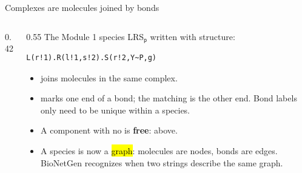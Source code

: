 \documentclass[aspectratio=169,10pt,t]{beamer}
\begin{document}
\begin{frame}[fragile]{Complexes are molecules joined by bonds}
  \begin{columns}[c]
    \begin{column}{0.42\textwidth}
      \centering
    \end{column}
    \begin{column}{0.55\textwidth}
      The Module 1 species LRS$_\mathsf{p}$ written with structure:
\begin{lstlisting}[language=bngl]
L(r!1).R(l!1,s!2).S(r!2,Y~P,g)
\end{lstlisting}
      \small
      \begin{itemize}
        \setlength\itemsep{1.2mm}
        \item<2->  joins molecules in the same complex.
        \item<3->  marks one end of a bond; the matching  is the other end.
              Bond labels only need to be unique within a species.
        \item<4-> A component with no \code{!} is \textbf{free}:  above.
        \item<5-> A species is now a \hl{graph}: molecules are nodes, bonds are edges.
              BioNetGen recognizes when two strings describe the same graph.
      \end{itemize}
    \end{column}
  \end{columns}
\end{frame}
\end{document}
